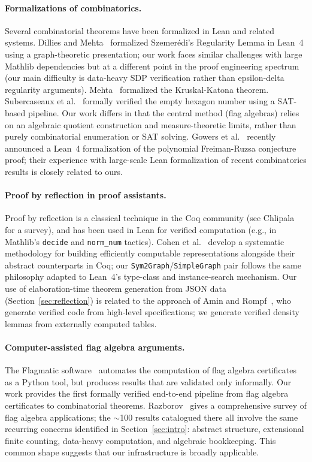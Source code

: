 \documentclass{article}
\newcommand{\lean}[1]{\texttt{#1}}
\begin{document}
\paragraph{Formalizations of combinatorics.}
Several combinatorial theorems have been formalized in Lean and related
systems.  Dillies and Mehta~\cite{dillies2022szemeredi} formalized
Szemer\'edi's Regularity Lemma in Lean~4 using a graph-theoretic presentation;
our work faces similar challenges with large Mathlib dependencies but at a
different point in the proof engineering spectrum (our main difficulty is
data-heavy SDP verification rather than epsilon-delta regularity arguments).
Mehta~\cite{mehta2022kruskal} formalized the Kruskal-Katona theorem.
Subercaseaux et al.~\cite{subercaseaux2024hexagon}
formally verified the empty hexagon number using a SAT-based pipeline.  Our
work differs in that the central method (flag algebras) relies on an algebraic
quotient construction and measure-theoretic limits, rather than purely
combinatorial enumeration or SAT solving.
Gowers et al.~\cite{gowers2024formalizing} recently announced a Lean~4
formalization of the polynomial Freiman-Ruzsa conjecture proof; their experience
with large-scale Lean formalization of recent combinatorics results is closely
related to ours.

\paragraph{Proof by reflection in proof assistants.}
Proof by reflection is a classical technique in the Coq community (see
Chlipala~\cite{chlipala2013cpdt} for a survey), and has been used
in Lean for verified computation (e.g., in Mathlib's \lean{decide} and
\lean{norm\_num} tactics).  Cohen et al.~\cite{cohen2013refinements}
develop a systematic methodology for building efficiently computable
representations alongside their abstract counterparts in Coq; our
\lean{Sym2Graph}/\lean{SimpleGraph} pair follows the same philosophy
adapted to Lean~4's type-class and instance-search mechanism.
Our use of elaboration-time theorem generation from JSON data (Section~\ref{sec:reflection})
is related to the approach of Amin and Rompf~\cite{amin2017collapsing},
who generate verified code from high-level specifications; we generate
verified density lemmas from externally computed tables.

\paragraph{Computer-assisted flag algebra arguments.}
The Flagmatic software~\cite{vaughan2013flagmatic} automates the
computation of flag algebra certificates as a Python tool, but produces results
that are validated only informally.  Our work provides the first formally
verified end-to-end pipeline from flag algebra certificates to combinatorial
theorems.  Razborov~\cite{razborov2013flag} gives a comprehensive survey of
flag algebra applications; the $\sim$100 results catalogued there all involve
the same recurring concerns identified in Section~\ref{sec:intro}: abstract
structure, extensional finite counting, data-heavy computation, and algebraic
bookkeeping.  This common shape suggests that our infrastructure is broadly
applicable.
\end{document}
